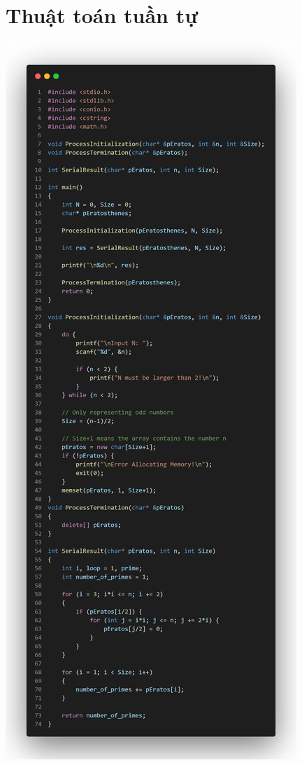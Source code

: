 \documentclass[12pt,a4paper]{report}
\begin{document}
\section{Thuật toán tuần tự}
\begin{center}
	\includegraphics[trim=0in 27in 0in 0in, clip, scale=0.35]{./Photos/Primes/Serial.PNG}

\end{center}
\end{document}
